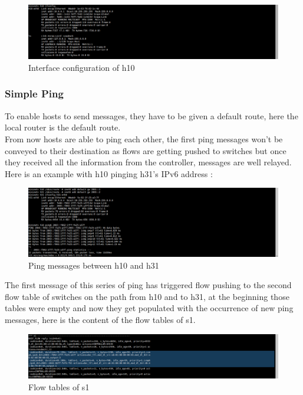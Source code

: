 \documentclass{article}
\begin{document}
\begin{figure}[h!]
  \centering
    \includegraphics[trim = 0mm 0mm 237mm 0mm,clip,scale=0.5]{reportPictures/h10_autoconfiguration.png}
  \caption{Interface configuration of h10}
\end{figure}


\subsubsection{Simple Ping}
To enable hosts to send messages, they have to be given a default
route, here the local router is the default route.\\
\newline
From now hosts are able to ping each other, the first ping messages
won't be conveyed to their destination as flows are getting pushed
to switches but once they received all the information from the
controller, messages are well relayed. Here is an example with h10
pinging h31's IPv6 address : 

\begin{figure}[h!]
  \centering
    \includegraphics[trim = 0mm 0mm 237mm 0mm,clip,scale=0.5]{reportPictures/h10_ping_h31.png}
  \caption{Ping messages between h10 and h31}
\end{figure}


The first message of this series of ping has triggered flow pushing to
the second flow table of switches on the path from h10 and to h31, at
the beginning those tables were empty and now they get populated with
the occurrence of new ping messages, here is the content of the flow
tables of s1.

\begin{figure}[h!]
  \centering
    \includegraphics[trim = 0mm 0mm 237mm 0mm,clip,scale=0.5]{reportPictures/s10_dumpflows.png}
  \caption{Flow tables of s1}
\end{figure}
\end{document}
